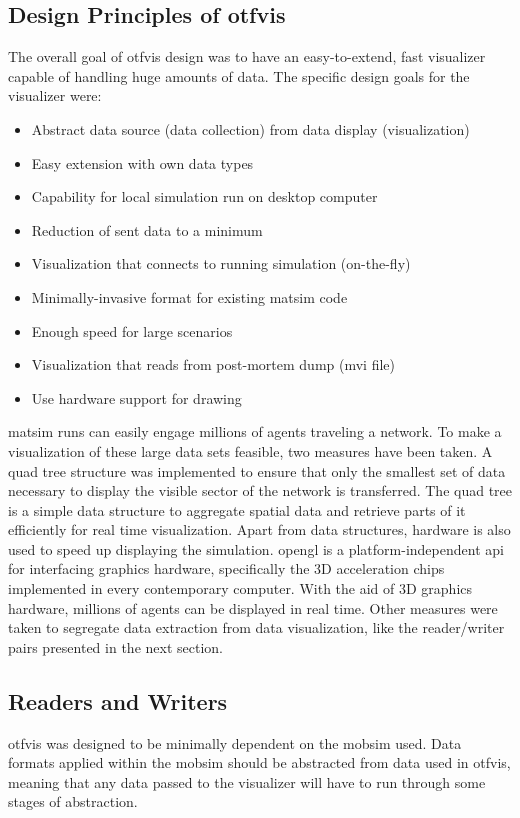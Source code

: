 \subsection{Design Principles of \gls{otfvis}}
The overall goal of \gls{otfvis} design was to have an easy-to-extend, fast visualizer capable of handling huge amounts of data. 
The specific design goals for the visualizer were:
%
\begin{itemize}
\item Abstract data source (data collection) from data display (visualization)
\item Easy extension with own data types
\item Capability for local simulation run on desktop computer
\item Reduction of sent data to a minimum
\item Visualization that connects to running simulation (on-the-fly)
\item Minimally-invasive format for existing \gls{matsim} code
\item Enough speed for large scenarios
\item Visualization that reads from post-mortem dump (\gls{mvi} file)
\item Use hardware support for drawing
\end{itemize}
%
\gls{matsim} runs can easily engage millions of agents traveling a network. To make a visualization of these large data sets feasible, two measures have been taken. A quad tree structure was implemented to ensure that only the smallest set of data necessary to display the visible sector of the network is transferred. The quad tree is a simple data structure to aggregate spatial data and retrieve parts of it efficiently for real time visualization. Apart from data structures, hardware is also used to speed up displaying the simulation. \gls{opengl} is a platform-independent \gls{api} for interfacing graphics hardware, specifically the 3D acceleration chips implemented in every contemporary computer. With the aid of 3D graphics hardware, millions of agents can be displayed in real time. Other measures were taken to segregate data extraction from data visualization, like the reader/writer pairs presented in the next section.

\subsection{Readers and Writers}
\gls{otfvis} was designed to be minimally dependent on the \gls{mobsim} used. Data formats applied within the \gls{mobsim} should be abstracted from data used in \gls{otfvis}, meaning that any data passed to the visualizer will have to run through some stages of abstraction.

